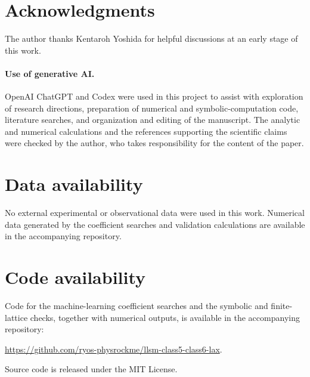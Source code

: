 \section*{Acknowledgments}

The author thanks Kentaroh Yoshida for helpful discussions at an early stage
of this work.

\paragraph{Use of generative AI.}
OpenAI ChatGPT and Codex were used in this project to assist with exploration
of research directions, preparation of numerical and symbolic-computation
code, literature searches, and organization and editing of the manuscript.
The analytic and numerical calculations and the references supporting the
scientific claims were checked by the author, who takes responsibility for
the content of the paper.

\section*{Data availability}

No external experimental or observational data were used in this work.
Numerical data generated by the coefficient searches and validation
calculations are available in the accompanying repository.

\section*{Code availability}

Code for the machine-learning coefficient searches and the symbolic and
finite-lattice checks, together with numerical outputs, is available in the
accompanying repository:\par\smallskip\noindent
\url{https://github.com/ryos-physrockme/llsm-class5-class6-lax}.
\par\smallskip\noindent
Source code is released under the MIT License.
